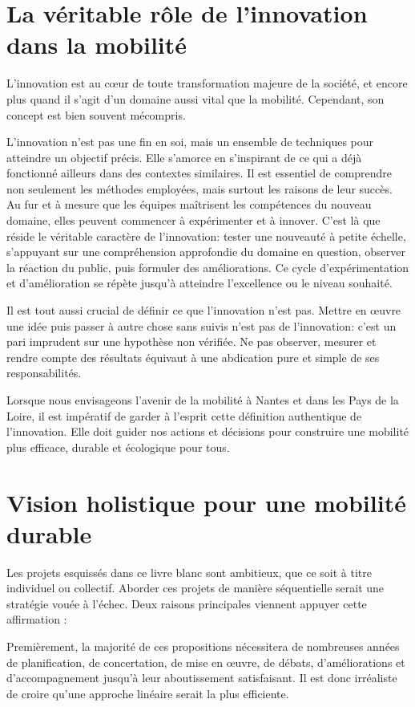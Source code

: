 \section{La véritable rôle de l'innovation dans la mobilité}

L'innovation est au cœur de toute transformation majeure de la
société, et encore plus quand il s'agit d'un domaine aussi vital que
la mobilité. Cependant, son concept est bien souvent mécompris.

L'innovation n'est pas une fin en soi, mais un ensemble de techniques
pour atteindre un objectif précis. Elle s'amorce en s'inspirant de ce
qui a déjà fonctionné ailleurs dans des contextes similaires. Il est
essentiel de comprendre non seulement les méthodes employées, mais
surtout les raisons de leur succès. Au fur et à mesure que les équipes
maîtrisent les compétences du nouveau domaine, elles peuvent commencer
à expérimenter et à innover. C'est là que réside le véritable
caractère de l'innovation: tester une nouveauté à petite échelle,
s'appuyant sur une compréhension approfondie du domaine en question,
observer la réaction du public, puis formuler des améliorations. Ce
cycle d'expérimentation et d'amélioration se répète jusqu'à atteindre
l'excellence ou le niveau souhaité.

Il est tout aussi crucial de définir ce que l'innovation n'est
pas. Mettre en œuvre une idée puis passer à autre chose sans suivis
n'est pas de l'innovation: c'est un pari imprudent sur une hypothèse
non vérifiée. Ne pas observer, mesurer et rendre compte des résultats
équivaut à une abdication pure et simple de ses responsabilités.

Lorsque nous envisageons l'avenir de la mobilité à Nantes et dans les
Pays de la Loire, il est impératif de garder à l'esprit cette
définition authentique de l'innovation. Elle doit guider nos actions
et décisions pour construire une mobilité plus efficace, durable et
écologique pour tous.


\section{Vision holistique pour une mobilité durable}

Les projets esquissés dans ce livre blanc sont ambitieux, que ce soit
à titre individuel ou collectif. Aborder ces projets de manière
séquentielle serait une stratégie vouée à l’échec. Deux raisons
principales viennent appuyer cette affirmation :

Premièrement, la majorité de ces propositions nécessitera de
nombreuses années de planification, de concertation, de mise en œuvre,
de débats, d’améliorations et d’accompagnement jusqu’à leur
aboutissement satisfaisant. Il est donc irréaliste de croire qu'une
approche linéaire serait la plus efficiente.

